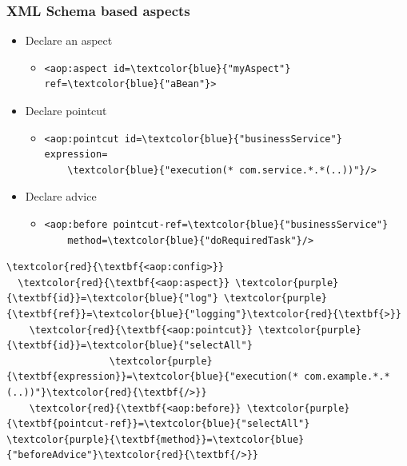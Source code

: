 \documentclass[10pt,xcolor=pdflatex, table]{beamer}
\begin{document}
\begin{frame}[fragile]\frametitle{XML Schema based aspects}
	\begin{itemize}
		\item Declare an aspect
        \begin{itemize}
        	\item
            	\begin{Verbatim}[fontsize=\footnotesize, commandchars=\\\{\}]
<aop:aspect id=\textcolor{blue}{"myAspect"} ref=\textcolor{blue}{"aBean"}>         
                \end{Verbatim}
        \end{itemize}
        \item Declare pointcut
        \begin{itemize}
        	\item 
            	\begin{Verbatim}[fontsize=\footnotesize, commandchars=\\\{\}]
<aop:pointcut id=\textcolor{blue}{"businessService"} expression=
    \textcolor{blue}{"execution(* com.service.*.*(..))"}/>
                \end{Verbatim}
        \end{itemize}
		\item Declare advice
        \begin{itemize}
        	\item 
            	\begin{Verbatim}[fontsize=\footnotesize, commandchars=\\\{\}]
<aop:before pointcut-ref=\textcolor{blue}{"businessService"}
    method=\textcolor{blue}{"doRequiredTask"}/>         
                \end{Verbatim}
        \end{itemize}
	\end{itemize}
    \begin{Verbatim}[fontsize=\footnotesize, commandchars=\\\{\}]
\textcolor{red}{\textbf{<aop:config>}}
  \textcolor{red}{\textbf{<aop:aspect}} \textcolor{purple}{\textbf{id}}=\textcolor{blue}{"log"} \textcolor{purple}{\textbf{ref}}=\textcolor{blue}{"logging"}\textcolor{red}{\textbf{>}}
    \textcolor{red}{\textbf{<aop:pointcut}} \textcolor{purple}{\textbf{id}}=\textcolor{blue}{"selectAll"} 
                  \textcolor{purple}{\textbf{expression}}=\textcolor{blue}{"execution(* com.example.*.*(..))"}\textcolor{red}{\textbf{/>}}
    \textcolor{red}{\textbf{<aop:before}} \textcolor{purple}{\textbf{pointcut-ref}}=\textcolor{blue}{"selectAll"} \textcolor{purple}{\textbf{method}}=\textcolor{blue}{"beforeAdvice"}\textcolor{red}{\textbf{/>}}

\end{Verbatim}
\end{frame}
\end{document}
